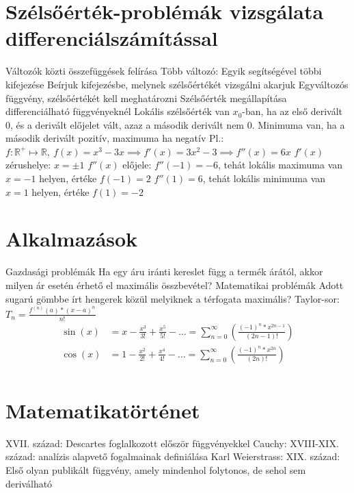 \documentclass[twoside,12pt]{report}
\theoremstyle{definition}
\begin{document}
\section{Szélsőérték-problémák vizsgálata differenciálszámítással}
	\begin{outline}
		\1 Változók közti összefüggések felírása
			\2 Több változó: Egyik segítségével többi kifejezése
			\2 Beírjuk kifejezésbe, melynek szélsőértékét vizsgálni akarjuk
				\3[->] Egyváltozós függvény, szélsőértékét kell meghatározni
		\1 Szélsőérték megállapítása differenciálható függvényeknél
			\2 Lokális szélsőérték van $x_0$-ban, ha az első derivált 0, és a derivált előjelet vált, azaz a második derivált nem 0.
			\2 Minimuma van, ha a második derivált pozitív, maximuma ha negatív
			\2 Pl.: $f:\mathbb{R}^+\mapsto\mathbb{R},\ f(x)=x^3-3x\implies f'(x)=3x^2-3\implies f''(x)=6x$
				\3 $f'(x)$ zérushelye: $x=\pm1$
				\3 $f''(x)$ előjele: 
					\4 $f''(-1)=-6$, tehát lokális maximuma van $x=-1$ helyen, értéke $f(-1)=2$
					\4 $f''(1)=6$, tehát lokális minimuma van $x=1$ helyen, értéke $f(1)=-2$
	\end{outline}
\section{Alkalmazások}
	\begin{outline}
		\1 Gazdasági problémák
			\2 Ha egy áru iránti kereslet függ a termék árától, akkor milyen ár esetén érhető el maximális összbevétel?
		\1 Matematikai problémák
			\2 Adott sugarú gömbbe írt hengerek közül melyiknek a térfogata maximális?
		\1 Taylor-sor:
			\2 $T_n=\frac{f^{(n)}(a)*(x-a)^n}{n!}$
			\2[]
			\begin{align*}
				\sin(x)&=x-\frac{x^3}{3!}+\frac{x^5}{5!}-\dots=\sum_{n=0}^{\infty} \left(\frac{(-1)^n*x^{2n-1}}{(2n-1)!}\right)\\
				\cos(x)&=1-\frac{x^2}{2!}+\frac{x^4}{4!}-\dots=\sum_{n=0}^{\infty} \left(\frac{(-1)^n*x^{2n}}{(2n)!}\right)\\
			\end{align*}
	\end{outline}
\section{Matematikatörténet}
	\begin{outline}
		\1 XVII. század: Descartes foglalkozott először függvényekkel
		\1 Cauchy: XVIII-XIX. század: analízis alapvető fogalmainak definiálása
		\1 Karl Weierstrass: XIX. század: Első olyan publikált függvény, amely mindenhol folytonos, de sehol sem deriválható
	\end{outline}
\end{document}
